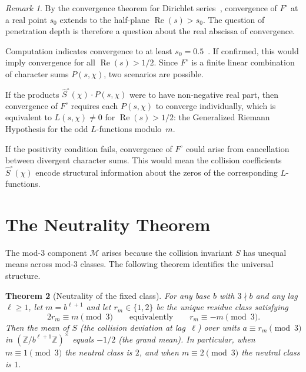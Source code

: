 \documentclass[12pt]{amsart}
\newtheorem{theorem}{Theorem}
\theoremstyle{definition}
\theoremstyle{remark}
\newtheorem{remark}[theorem]{Remark}
\begin{document}
\begin{remark}
By the convergence theorem for Dirichlet
series~\cite{hardy}, convergence of $F^{\circ}$ at a
real point $s_0$ extends to the half-plane
$\operatorname{Re}(s) > s_0$. The question of
penetration depth is therefore a question about the
real abscissa of convergence.

Computation indicates convergence to at least
$s_0 = 0.5$~\cite{paper17}. If confirmed, this would
imply convergence for all
$\operatorname{Re}(s) > 1/2$. Since $F^{\circ}$ is
a finite linear combination of character sums
$P(s, \chi)$, two scenarios are possible.

If the products
$\hat{S}^{\circ}(\chi) \cdot P(s, \chi)$ were to have
non-negative real part,
then convergence of $F^{\circ}$ requires each
$P(s, \chi)$ to converge individually, which is
equivalent to $L(s, \chi) \ne 0$ for
$\operatorname{Re}(s) > 1/2$: the Generalized Riemann
Hypothesis for the odd $L$-functions modulo~$m$.

If the positivity condition fails, convergence of
$F^{\circ}$ could arise from cancellation between
divergent character sums. This would mean the
collision coefficients $\hat{S}^{\circ}(\chi)$ encode
structural information about the zeros of the
corresponding $L$-functions.
\end{remark}

\section{The Neutrality Theorem}

The mod-$3$ component $\mathcal{M}$ arises because the
collision invariant $S$ has unequal means across mod-$3$
classes. The following theorem identifies the universal
structure.

\begin{theorem}[Neutrality of the fixed class]\label{thm:neutral}
For any base $b$ with $3 \nmid b$ and any lag
$\ell \ge 1$, let $m=b^{\ell+1}$ and let
$r_m \in \{1,2\}$ be the unique residue class satisfying
\[
2r_m \equiv m \pmod{3}
\qquad\text{equivalently}\qquad
r_m \equiv -m \pmod{3}.
\]
Then the mean of $S$ (the collision deviation at lag~$\ell$)
over units
$a \equiv r_m \pmod{3}$ in
$(\mathbb{Z}/b^{\ell+1}\mathbb{Z})^{\times}$ equals
$-1/2$ (the grand mean). In particular, when
$m \equiv 1 \pmod{3}$ the neutral class is $2$, and when
$m \equiv 2 \pmod{3}$ the neutral class is $1$.
\end{theorem}
\end{document}
